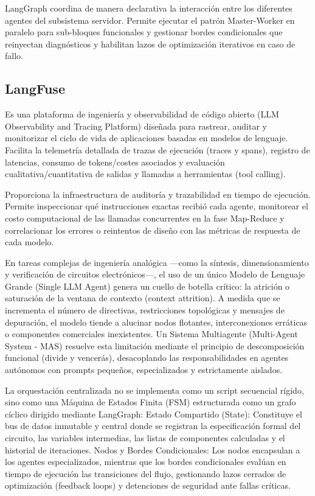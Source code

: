 LangGraph coordina de manera declarativa la interacción entre los diferentes agentes del subsistema servidor. Permite ejecutar el patrón Master-Worker en paralelo para sub-bloques funcionales y gestionar bordes condicionales que reinyectan diagnósticos y habilitan lazos de optimización iterativos en caso de fallo.   

\subsection{LangFuse}

Es una plataforma de ingeniería y observabilidad de código abierto (LLM Observability and Tracing Platform) diseñada para rastrear, auditar y monitorizar el ciclo de vida de aplicaciones basadas en modelos de lenguaje. Facilita la telemetría detallada de trazas de ejecución (traces y spans), registro de latencias, consumo de tokens/costes asociados y evaluación cualitativa/cuantitativa de salidas y llamadas a herramientas (tool calling).

Proporciona la infraestructura de auditoría y trazabilidad en tiempo de ejecución. Permite inspeccionar qué instrucciones exactas recibió cada agente, monitorear el costo computacional de las llamadas concurrentes en la fase Map-Reduce y correlacionar los errores o reintentos de diseño con las métricas de respuesta de cada modelo.


En tareas complejas de ingeniería analógica —como la síntesis, dimensionamiento y verificación de circuitos electrónicos—, el uso de un único Modelo de Lenguaje Grande (Single LLM Agent) genera un cuello de botella crítico: la atrición o saturación de la ventana de contexto (context attrition). A medida que se incrementa el número de directivas, restricciones topológicas y mensajes de depuración, el modelo tiende a alucinar nodos flotantes, interconexiones erráticas o componentes comerciales inexistentes.   Un Sistema Multiagente (Multi-Agent System - MAS) resuelve esta limitación mediante el principio de descomposición funcional (divide y vencerás), desacoplando las responsabilidades en agentes autónomos con prompts pequeños, especializados y estrictamente aislados.

La orquestación centralizada no se implementa como un script secuencial rígido, sino como una Máquina de Estados Finita (FSM) estructurada como un grafo cíclico dirigido mediante LangGraph:   Estado Compartido (State): Constituye el bus de datos inmutable y central donde se registran la especificación formal del circuito, las variables intermedias, las listas de componentes calculadas y el historial de iteraciones.   Nodos y Bordes Condicionales: Los nodos encapsulan a los agentes especializados, mientras que los bordes condicionales evalúan en tiempo de ejecución las transiciones del flujo, gestionando lazos cerrados de optimización (feedback loops) y detenciones de seguridad ante fallas críticas.

